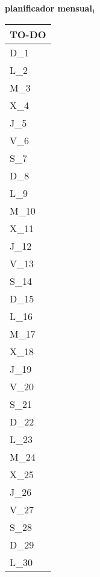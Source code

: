\clearpage
{\raggedright
	\fontsize{25}{50}\selectfont
	\textbf{\NextYear}
}\scriptsize{\textbf{planificador mensual$_1$}}\\[11.3pt]



	\noindent\dotfill
	\renewcommand{\arraystretch}{1.5}\scriptsize
		\begin{longtabu} to \textwidth { X[l]}
		\centering \small{\textbf{TO-DO}} \\
		\toprule
		D_{1} \dotfill\\
		\hline
		L_{2} \dotfill\\
		M_{3} \dotfill\\
		X_{4} \dotfill\\
		J_{5} \dotfill\\
		V_{6} \dotfill\\
		S_{7} \dotfill\\
		D_{8} \dotfill\\
		\hline
		L_{9} \dotfill\\
		M_{10} \dotfill\\
		X_{11} \dotfill\\
		J_{12} \dotfill\\
		V_{13} \dotfill\\
		S_{14} \dotfill\\
		D_{15} \dotfill\\
		\hline
		L_{16} \dotfill\\
		M_{17} \dotfill\\
		X_{18} \dotfill\\
		J_{19} \dotfill\\
		V_{20} \dotfill\\
		S_{21} \dotfill\\
		D_{22} \dotfill\\
		\hline
		L_{23} \dotfill\\
		M_{24} \dotfill\\
		X_{25} \dotfill\\
		J_{26} \dotfill\\
		V_{27} \dotfill\\
		S_{28} \dotfill\\
		D_{29} \dotfill\\
		\hline
		L_{30} \dotfill\\

		\bottomrule

	\end{longtabu}


\clearpage
